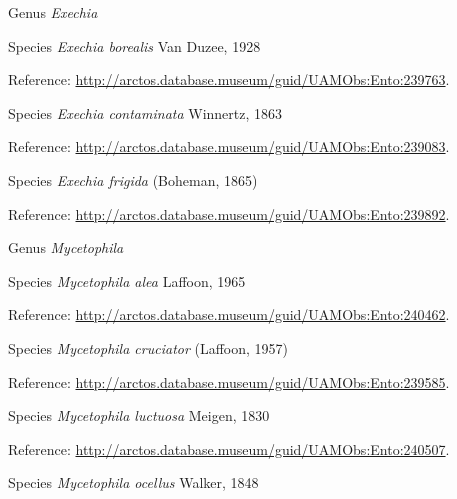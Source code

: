 \documentclass[9pt, article]{memoir}
\begin{document}
\begin{multicols}{2}
\vspace{6pt}\noindent\hspace{30pt}Genus \textit{Exechia}


\vspace{6pt}\noindent\hspace{36pt}Species \textit{Exechia borealis} Van Duzee, 1928


\vspace{6pt}Reference: 
\url{http://arctos.database.museum/guid/UAMObs:Ento:239763}.

\vspace{6pt}\noindent\hspace{36pt}Species \textit{Exechia contaminata} Winnertz, 1863


\vspace{6pt}Reference: 
\url{http://arctos.database.museum/guid/UAMObs:Ento:239083}.

\vspace{6pt}\noindent\hspace{36pt}Species \textit{Exechia frigida} (Boheman, 1865)


\vspace{6pt}Reference: 
\url{http://arctos.database.museum/guid/UAMObs:Ento:239892}.

\vspace{6pt}\noindent\hspace{30pt}Genus \textit{Mycetophila}


\vspace{6pt}\noindent\hspace{36pt}Species \textit{Mycetophila alea} Laffoon, 1965


\vspace{6pt}Reference: 
\url{http://arctos.database.museum/guid/UAMObs:Ento:240462}.

\vspace{6pt}\noindent\hspace{36pt}Species \textit{Mycetophila cruciator} (Laffoon, 1957)


\vspace{6pt}Reference: 
\url{http://arctos.database.museum/guid/UAMObs:Ento:239585}.

\vspace{6pt}\noindent\hspace{36pt}Species \textit{Mycetophila luctuosa} Meigen, 1830


\vspace{6pt}Reference: 
\url{http://arctos.database.museum/guid/UAMObs:Ento:240507}.

\vspace{6pt}\noindent\hspace{36pt}Species \textit{Mycetophila ocellus} Walker, 1848



\end{multicols}
\end{document}
